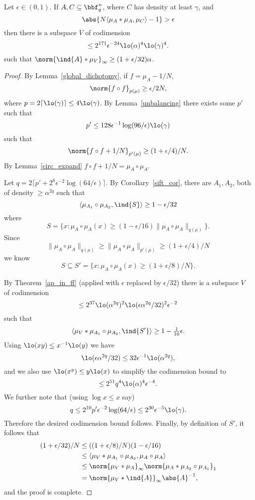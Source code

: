 \begin{proposition}
\label{di_in_ff}
\leanok
Let $\epsilon \in (0,1)$. If $A,C\subseteq \bbf_q^n$, where $C$ has density at least $\gamma$, and
\[\abs{N\langle \mu_A\ast \mu_A,\mu_C\rangle -1}> \epsilon\]
then there is a subspace $V$ of codimension
\[\leq 2^{171}\epsilon^{-24}\lo(\alpha)^4\lo(\gamma)^4.\]
such that $\norm{\ind{A}\ast \mu_V}_\infty \geq (1+\epsilon/32)\alpha$.
\end{proposition}

\begin{proof}
By Lemma~\ref{global_dichotomy}, if $f=\mu_A-1/N$,
\[\norm{f\circ f}_{p(\mu)}\geq \epsilon /2N,\]
where $p=2\lceil \lo(\gamma)\rceil\leq 4\lo(\gamma)$. By Lemma~\ref{unbalancing} there exists some $p'$ such that
\[p'\leq 128\epsilon^{-1}\log(96/\epsilon)\lo(\gamma)\]
such that
\[\norm{f\circ f+1/N}_{p'(\mu)}\geq (1+\epsilon/4)/N.\]
By Lemma~\ref{circ_expand} $f\circ f+1/N=\mu_A\circ \mu_A$.

Let $q=2\lceil p'+2^8\epsilon^{-2}\log(64/\epsilon)\rceil$. By Corollary~\ref{sift_cor}, there are $A_1,A_2$, both of density $\geq \alpha^{2q}$ such that
\[\langle \mu_{A_1}\circ \mu_{A_2},\ind{S}\rangle \geq 1-\epsilon/32\]
where
\[S=\{x : \mu_A\circ \mu_A(x)\geq (1-\epsilon/16)\| \mu_A\circ \mu_A\|_{q(\mu)}\}.\]
Since
\[\| \mu_A\circ \mu_A\|_{q(\mu)}\geq \| \mu_A\circ \mu_A\|_{p'(\mu)}\geq (1+\epsilon/4)/N\]
we know
\[S\subseteq S'=\{x : \mu_A\circ \mu_A(x)\geq (1+\epsilon/8)/N\}.\]

By Theorem~\ref{ap_in_ff} (applied with $\epsilon$ replaced by $\epsilon/32$) there is a subspace $V$ of codimension
\[\leq 2^{37}\lo(\alpha^{2q})^2\lo(\epsilon\alpha^{2q}/32)^2\epsilon^{-2}\] such that
\[\langle \mu_V\ast \mu_{A_1}\circ \mu_{A_2},\ind{S'}\rangle \geq 1-\tfrac{1}{16}\epsilon.\]
Using $\lo(xy)\leq x^{-1}\lo(y)$ we have
\[\lo(\epsilon \alpha^{2q}/32)\leq 32\epsilon^{-1}\lo(\alpha^{2q}),\]
and we also use $\lo(x^y)\leq y\lo(x)$ to simplify the codimension bound to
\[\leq 2^{51}q^4\lo(\alpha)^4\epsilon^{-4}.\]
We further note that (using $\log x\leq x$ say)
\[q\leq 2^{10}p'\epsilon^{-2}\log(64/\epsilon)\leq 2^{30}\epsilon^{-5}\lo(\gamma).\]
Therefore the desired codimension bound follows. Finally, by definition of $S'$, it follows that
\begin{align*}
(1+\epsilon/32)/N
&\leq ((1+\epsilon/8)/N)(1-\epsilon/16)\\
&\leq \langle \mu_V\ast \mu_{A_1}\circ \mu_{A_2},\mu_A\circ \mu_A\rangle\\
&\leq \norm{\mu_V\ast \mu_A}_\infty \norm{\mu_{A}\ast \mu_{A_2}\circ \mu_{A_1}}_1\\
&= \norm{\mu_V\ast \ind{A}}_\infty\abs{A}^{-1},
\end{align*}
and the proof is complete.
\end{proof}


